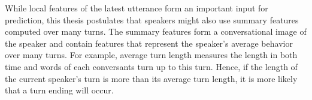 While local features of the latest utterance form an important input for prediction, this thesis postulates that speakers might also use summary features computed over many turns. The summary features form a conversational image of the speaker and contain features that represent the speaker's average behavior over many turns. For example, average turn length measures the length in both time and words of each conversants turn up to this turn. Hence, if the length of the current speaker's turn is more than its average turn length, it is more likely that a turn ending will occur.






